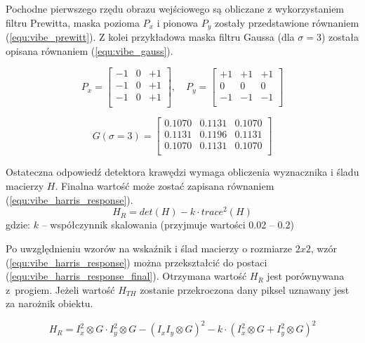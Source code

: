 Pochodne pierwszego rzędu obrazu wejściowego są obliczane z wykorzystaniem filtru Prewitta, maska pozioma $P_x$ i pionowa $P_y$ zostały przedstawione równaniem (\ref{equ:vibe_prewitt}). 
Z kolei przykładowa maska filtru Gaussa (dla $\sigma = 3$) została opisana równaniem (\ref{equ:vibe_gauss}).

    \begin{equation}
        P_x = \begin{bmatrix}
			    -1 & 0 & +1 \\
			    -1 & 0 & +1 \\
			    -1 & 0 & +1 \\
		    \end{bmatrix}
		,\quad 
		P_y= \begin{bmatrix}
			    +1 & +1 & +1 \\
			    0 & 0 & 0 \\
			    -1 & -1 & -1 \\
		    \end{bmatrix}
        \label{equ:vibe_prewitt}
    \end{equation}

    \begin{equation}
       G(\sigma=3) = \begin{bmatrix}
			   0.1070 & 0.1131 & 0.1070 \\
			   0.1131 & 0.1196 & 0.1131 \\
			   0.1070 & 0.1131 & 0.1070 \\
		    \end{bmatrix}
        \label{equ:vibe_gauss}
    \end{equation}


Ostateczna odpowiedź detektora krawędzi wymaga obliczenia wyznacznika i śladu macierzy $H$. 
Finalna wartość może zostać zapisana równaniem (\ref{equ:vibe_harris_response}).
    \begin{equation}
        H_R = det(H)-k \cdot trace^2(H)
        \label{equ:vibe_harris_response}
    \end{equation}
gdzie: $k$ -- współczynnik skalowania (przyjmuje wartości \num{0.02} -- \num{0.2})


Po uwzględnieniu wzorów na wskaźnik i ślad macierzy o rozmiarze $2x2$, wzór (\ref{equ:vibe_harris_response}) można przekształcić do postaci (\ref{equ:vibe_harris_response_final}). 
Otrzymana wartość $H_R$ jest porównywana z~progiem. 
Jeżeli wartość $H_{TH}$ zostanie przekroczona dany piksel uznawany jest za narożnik obiektu.  

    \begin{equation}
        H_R = I_x^2 \otimes G \cdot I_y^2 \otimes G - (I_x I_y \otimes G)^2  - k \cdot (I_x^2 \otimes G + I_y^2 \otimes G)^2
        \label{equ:vibe_harris_response_final}
    \end{equation}

